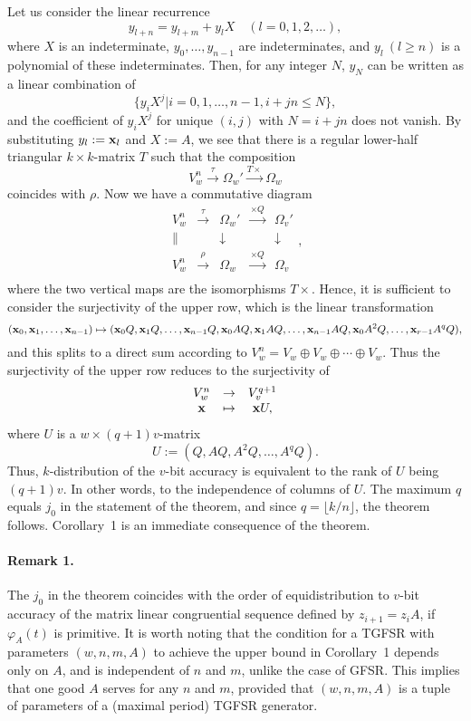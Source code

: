 Let us consider the linear recurrence
$$
 y_{l+n} = y_{l+m} + y_lX \quad (l=0,1,2,\ldots),
$$
where $X$ is an indeterminate, $y_0,\ldots,y_{n-1}$ are
indeterminates, and $y_l \ (l\geq n)$ is a polynomial of these
indeterminates.
Then, for any integer $N$,
$y_N$ can be written as a linear combination of
$$
\{
y_iX^j | i=0,1,\ldots,n-1, i+jn \leq N
\},
$$
and the coefficient of $y_iX^j$
for unique $(i,j)$ with $N=i+jn$ does not vanish.
By substituting $y_l:={\bf x}_l$ and $X:= A$,
we see that there is a regular lower-half triangular 
$k\times k$-matrix
$T$ such that the composition
$$
V_w^n \stackrel{\tau}\rightarrow \Omega_w' 
\stackrel{T\times}{\rightarrow}\Omega_w 
$$
coincides with $\rho$.
Now we have a commutative diagram
$$
\begin{array}{ccccc}
V_w^n & \stackrel{\tau}\rightarrow & \Omega_w' &
\stackrel{\times Q}{\rightarrow} & \Omega_v'\\
\| & & \downarrow & & \downarrow \\
V_w^n & \stackrel{\rho}\rightarrow & \Omega_w &
\stackrel{\times Q}{\rightarrow} & \Omega_v\\
\end{array},
$$
where the two vertical maps are the isomorphisms $T\times$.
Hence, 
it is sufficient to consider the surjectivity of the upper row,
which is the linear transformation
$$
({\bf x}_0,{\bf x}_1,\ldots,{\bf x}_{n-1})\mapsto
({\bf x}_0Q,{\bf x}_1Q,\ldots,{\bf x}_{n-1}Q,{\bf x}_0AQ,{\bf x}_1AQ,\ldots,{\bf x}_{n-1}AQ,
{\bf x}_0A^2Q,\ldots, {\bf x}_{r-1}A^qQ),
$$
and this splits to a direct sum according to
$V_w^n=V_w\oplus V_w\oplus\cdots \oplus V_w$.
Thus the surjectivity of the upper row reduces to the surjectivity of
$$
\begin{array}{ccc}
V_w^n & \rightarrow & V_v^{q+1} \\
{\bf x} & \mapsto & {\bf x} U,
\end{array}
$$
where $U$ is a $w\times (q+1)v$-matrix  
$$
U:= (Q, AQ, A^2Q, \ldots, A^qQ).
$$
Thus, $k$-distribution of the $v$-bit accuracy
is equivalent to the rank of $U$ being $(q+1)v$. In other words,
to the independence of columns of $U$.
The maximum $q$ equals $j_0$ in the statement of the theorem,
and since $q= \lfloor k / n \rfloor$, the theorem follows.
Corollary~1 is an immediate consequence of the theorem.

\paragraph{Remark 1.}
The $j_0$ in the theorem coincides with the order of equidistribution
to $v$-bit accuracy of the matrix linear congruential sequence
defined by
$ z_{i+1}=z_iA$,
if $\varphi_A(t)$ is primitive.
It is worth noting that the condition
for a TGFSR with parameters
$(w,n,m,A)$ 
to achieve the upper bound in Corollary~1 depends only on $A$,
and is independent of $n$ and $m$,
unlike the case of GFSR\cite{tootill}\cite{fushimi}.
This implies that one good $A$ serves for any $n$ and $m$,
provided that $(w,n,m,A)$ is a tuple of parameters of a 
(maximal period)
TGFSR generator.
\vskip 3mm

